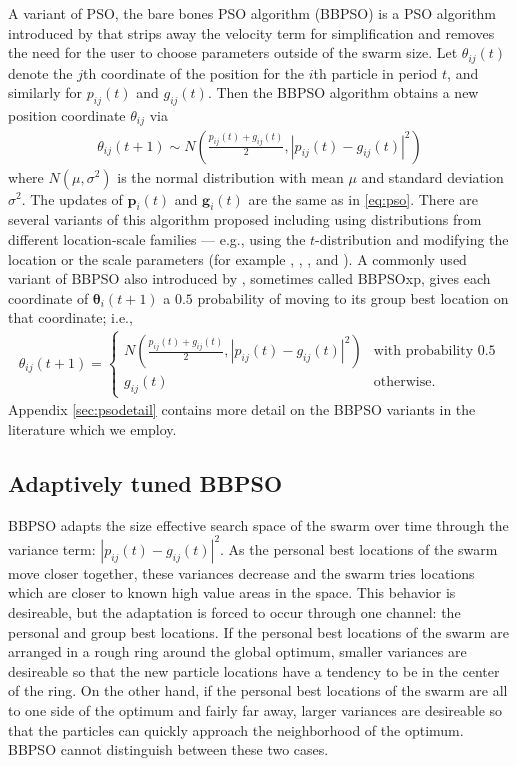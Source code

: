\documentclass[12pt]{article}
\begin{document}
A variant of PSO, the bare bones PSO algorithm (BBPSO) is a PSO algorithm introduced by \citet{kennedy2003bare} that strips away the velocity term for simplification and removes the need for the user to choose parameters outside of the swarm size. Let $\theta_{ij}(t)$ denote the $j$th coordinate of the position for the $i$th particle in period $t$, and similarly for $p_{ij}(t)$ and $g_{ij}(t)$. Then the BBPSO algorithm obtains a new position coordinate $\theta_{ij}$ via
\begin{align}\label{eq:bbpso}
\theta_{ij}(t+1) \sim N\left(\frac{p_{ij}(t) + g_{ij}(t)}{2}, |p_{ij}(t) - g_{ij}(t)|^2\right)
\end{align}
where $N(\mu,\sigma^2)$ is the normal distribution with mean $\mu$ and standard deviation $\sigma^2$. The updates of $\bm{p}_i(t)$ and $\bm{g}_i(t)$ are the same as in \eqref{eq:pso}. There are several variants of this algorithm proposed including using distributions from different location-scale families --- e.g., using the $t$-distribution and modifying the location or the scale parameters (for example \citet{krohling2009bare}, \citet{hsieh2010modified}, \citet{richer2006levy}, and \citet{campos2014bare}). A commonly used variant of BBPSO also introduced by \citet{kennedy2003bare}, sometimes called BBPSOxp, gives each coordinate of $\bm{\theta}_i(t+1)$ a $0.5$ probability of moving to its group best location on that coordinate; i.e.,
\begin{align*}
\theta_{ij}(t+1) = \begin{cases} N\left(\frac{p_{ij}(t) + g_{ij}(t)}{2}, |p_{ij}(t) - g_{ij}(t)|^2\right) & \mbox{with probability }0.5\\
g_{ij}(t) &\mbox{otherwise}.\end{cases}
\end{align*}
Appendix \ref{sec:psodetail} contains more detail on the BBPSO variants in the literature which we employ.

\subsection{Adaptively tuned BBPSO}\label{subsec:ATBBPSO}
BBPSO adapts the size effective search space of the swarm over time through the variance term: $|p_{ij}(t) - g_{ij}(t)|^2$. As the personal best locations of the swarm move closer together, these variances decrease and the swarm tries locations which are closer to known high value areas in the space. This behavior is desireable, but the adaptation is forced to occur through one channel: the personal and group best locations. If the personal best locations of the swarm are arranged in a rough ring around the global optimum, smaller variances are desireable so that the new particle locations have a tendency to be in the center of the ring. On the other hand, if the personal best locations of the swarm are all to one side of the optimum and fairly far away, larger variances are desireable so that the particles can quickly approach the neighborhood of the optimum. BBPSO cannot distinguish between these two cases. 
\end{document}
